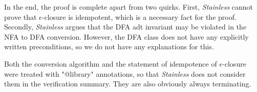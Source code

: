 \documentclass[12pt, a4paper]{article}
\theoremstyle{break}
\begin{document}
In the end, the proof is complete apart from two quirks. First,
\textit{Stainless} cannot prove that $\epsilon$-closure is idempotent, which is
a necessary fact for the proof. Secondly, \textit{Stainless} argues that the DFA
adt invariant may be violated in the NFA to DFA conversion. However, the DFA
class does not have any explicitly written preconditions, so we do not have any
explanations for this.

Both the conversion algorithm and the statement of idempotence of
$\epsilon$-closure were treated with "@library" annotations, so that
\textit{Stainless} does not consider them in the verification summary. They are
also obviously always terminating.
\end{document}
